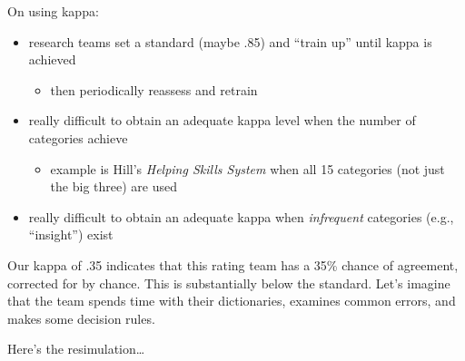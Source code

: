 \documentclass[
  english,
]{book}
\providecommand{\tightlist}{%
  \setlength{\itemsep}{0pt}\setlength{\parskip}{0pt}}
\begin{document}
On using kappa:

\begin{itemize}
\tightlist
\item
  research teams set a standard (maybe .85) and ``train up'' until kappa is achieved

  \begin{itemize}
  \tightlist
  \item
    then periodically reassess and retrain
  \end{itemize}
\item
  really difficult to obtain an adequate kappa level when the number of categories achieve

  \begin{itemize}
  \tightlist
  \item
    example is Hill's \emph{Helping Skills System} when all 15 categories (not just the big three) are used
  \end{itemize}
\item
  really difficult to obtain an adequate kappa when \emph{infrequent} categories (e.g., ``insight'') exist
\end{itemize}

Our kappa of .35 indicates that this rating team has a 35\% chance of agreement, corrected for by chance. This is substantially below the standard. Let's imagine that the team spends time with their dictionaries, examines common errors, and makes some decision rules.

Here's the resimulation\ldots{}
\end{document}
